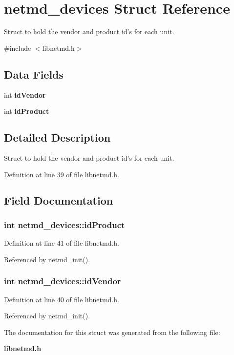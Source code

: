 \section{netmd\_\-devices Struct Reference}
\label{structnetmd__devices}


Struct to hold the vendor and product id's for each unit.  


{\ttfamily \#include $<$libnetmd.h$>$}\subsection*{Data Fields}
\begin{DoxyCompactItemize}
\item 
int {\bf idVendor}
\item 
int {\bf idProduct}
\end{DoxyCompactItemize}


\subsection{Detailed Description}
Struct to hold the vendor and product id's for each unit. 

Definition at line 39 of file libnetmd.h.

\subsection{Field Documentation}
\subsubsection[{idProduct}]{\setlength{\rightskip}{0pt plus 5cm}int {\bf netmd\_\-devices::idProduct}}\label{structnetmd__devices_ad2e5849d65ed4a2663a6f51911fa7e69}


Definition at line 41 of file libnetmd.h.

Referenced by netmd\_\-init().
\subsubsection[{idVendor}]{\setlength{\rightskip}{0pt plus 5cm}int {\bf netmd\_\-devices::idVendor}}\label{structnetmd__devices_a92ada692b516d8e0558ee55587a62b2d}


Definition at line 40 of file libnetmd.h.

Referenced by netmd\_\-init().

The documentation for this struct was generated from the following file:\begin{DoxyCompactItemize}
\item 
{\bf libnetmd.h}\end{DoxyCompactItemize}
